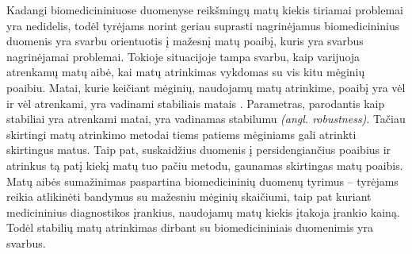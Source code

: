 

Kadangi biomedicininiuose duomenyse reikšmingų matų kiekis tiriamai problemai yra nedidelis, todėl tyrėjams norint geriau suprasti nagrinėjamus biomedicininius duomenis yra svarbu orientuotis į mažesnį matų poaibį, kuris yra svarbus nagrinėjamai problemai. Tokioje situacijoje tampa svarbu, kaip varijuoja atrenkamų matų aibė, kai matų atrinkimas vykdomas su vis kitu mėginių poaibiu. Matai, kurie keičiant mėginių, naudojamų matų atrinkime, poaibį yra vėl ir vėl atrenkami, yra vadinami stabiliais matais \cite{devijver1982pattern}. Parametras, parodantis kaip stabiliai yra atrenkami matai, yra vadinamas stabilumu \textit{(angl. robustness)}. Tačiau skirtingi matų atrinkimo metodai tiems patiems mėginiams gali atrinkti skirtingus matus. Taip pat, suskaidžius duomenis į persidengiančius poaibius ir atrinkus tą patį kiekį matų tuo pačiu metodu, gaunamas skirtingas matų poaibis. Matų aibės sumažinimas paspartina biomedicininių duomenų tyrimus -- tyrėjams reikia atlikinėti bandymus su mažesniu mėginių skaičiumi, taip 
pat kuriant medicininius diagnostikos įrankius, naudojamų matų kiekis įtakoja įrankio kainą. Todėl stabilių matų atrinkimas dirbant su biomedicininiais duomenimis yra svarbus.



